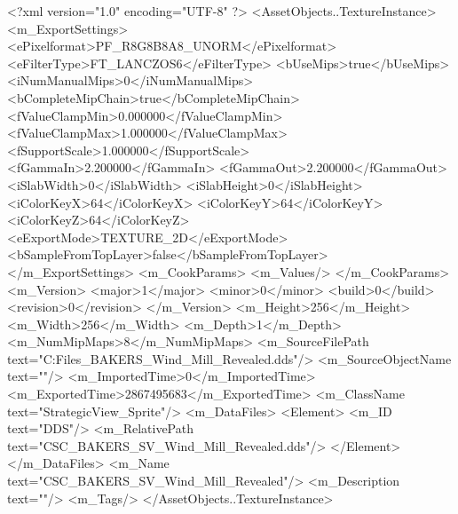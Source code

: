 <?xml version="1.0" encoding="UTF-8" ?>
<AssetObjects..TextureInstance>
	<m_ExportSettings>
		<ePixelformat>PF_R8G8B8A8_UNORM</ePixelformat>
		<eFilterType>FT_LANCZOS6</eFilterType>
		<bUseMips>true</bUseMips>
		<iNumManualMips>0</iNumManualMips>
		<bCompleteMipChain>true</bCompleteMipChain>
		<fValueClampMin>0.000000</fValueClampMin>
		<fValueClampMax>1.000000</fValueClampMax>
		<fSupportScale>1.000000</fSupportScale>
		<fGammaIn>2.200000</fGammaIn>
		<fGammaOut>2.200000</fGammaOut>
		<iSlabWidth>0</iSlabWidth>
		<iSlabHeight>0</iSlabHeight>
		<iColorKeyX>64</iColorKeyX>
		<iColorKeyY>64</iColorKeyY>
		<iColorKeyZ>64</iColorKeyZ>
		<eExportMode>TEXTURE_2D</eExportMode>
		<bSampleFromTopLayer>false</bSampleFromTopLayer>
	</m_ExportSettings>
	<m_CookParams>
		<m_Values/>
	</m_CookParams>
	<m_Version>
		<major>1</major>
		<minor>0</minor>
		<build>0</build>
		<revision>0</revision>
	</m_Version>
	<m_Height>256</m_Height>
	<m_Width>256</m_Width>
	<m_Depth>1</m_Depth>
	<m_NumMipMaps>8</m_NumMipMaps>
	<m_SourceFilePath text="C:\Users\Shadow\Desktop\Working Files\Icons\StrategicView\CSC_BAKERS_Wind_Mill_Revealed.dds"/>
	<m_SourceObjectName text=""/>
	<m_ImportedTime>0</m_ImportedTime>
	<m_ExportedTime>2867495683</m_ExportedTime>
	<m_ClassName text="StrategicView_Sprite"/>
	<m_DataFiles>
		<Element>
			<m_ID text="DDS"/>
			<m_RelativePath text="CSC_BAKERS_SV_Wind_Mill_Revealed.dds"/>
		</Element>
	</m_DataFiles>
	<m_Name text="CSC_BAKERS_SV_Wind_Mill_Revealed"/>
	<m_Description text=""/>
	<m_Tags/>
</AssetObjects..TextureInstance>


